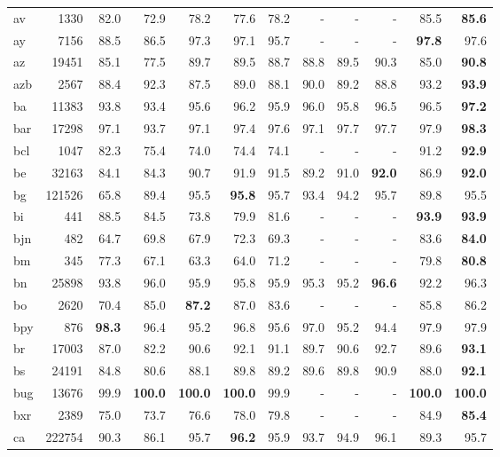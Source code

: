 \documentclass[11pt,a4paper]{article}
\begin{document}
\begin{supertabular}{lrrr|rrr|rrr|rr}
av & 1330 & 82.0 & 72.9 & 78.2 & 77.6 & 78.2 & - & - & - & 85.5 & \textbf{85.6}\\
ay & 7156 & 88.5 & 86.5 & 97.3 & 97.1 & 95.7 & - & - & - & \textbf{97.8} & 97.6\\
az & 19451 & 85.1 & 77.5 & 89.7 & 89.5 & 88.7 & 88.8 & 89.5 & 90.3 & 85.0 & \textbf{90.8}\\
azb & 2567 & 88.4 & 92.3 & 87.5 & 89.0 & 88.1 & 90.0 & 89.2 & 88.8 & 93.2 & \textbf{93.9}\\
ba & 11383 & 93.8 & 93.4 & 95.6 & 96.2 & 95.9 & 96.0 & 95.8 & 96.5 & 96.5 & \textbf{97.2}\\
bar & 17298 & 97.1 & 93.7 & 97.1 & 97.4 & 97.6 & 97.1 & 97.7 & 97.7 & 97.9 & \textbf{98.3}\\
bcl & 1047 & 82.3 & 75.4 & 74.0 & 74.4 & 74.1 & - & - & - & 91.2 & \textbf{92.9}\\
be & 32163 & 84.1 & 84.3 & 90.7 & 91.9 & 91.5 & 89.2 & 91.0 & \textbf{92.0} & 86.9 & \textbf{92.0}\\
bg & 121526 & 65.8 & 89.4 & 95.5 & \textbf{95.8} & 95.7 & 93.4 & 94.2 & 95.7 & 89.8 & 95.5\\
bi & 441 & 88.5 & 84.5 & 73.8 & 79.9 & 81.6 & - & - & - & \textbf{93.9} & \textbf{93.9}\\
bjn & 482 & 64.7 & 69.8 & 67.9 & 72.3 & 69.3 & - & - & - & 83.6 & \textbf{84.0}\\
bm & 345 & 77.3 & 67.1 & 63.3 & 64.0 & 71.2 & - & - & - & 79.8 & \textbf{80.8}\\
bn & 25898 & 93.8 & 96.0 & 95.9 & 95.8 & 95.9 & 95.3 & 95.2 & \textbf{96.6} & 92.2 & 96.3\\
bo & 2620 & 70.4 & 85.0 & \textbf{87.2} & 87.0 & 83.6 & - & - & - & 85.8 & 86.2\\
bpy & 876 & \textbf{98.3} & 96.4 & 95.2 & 96.8 & 95.6 & 97.0 & 95.2 & 94.4 & 97.9 & 97.9\\
br & 17003 & 87.0 & 82.2 & 90.6 & 92.1 & 91.1 & 89.7 & 90.6 & 92.7 & 89.6 & \textbf{93.1}\\
bs & 24191 & 84.8 & 80.6 & 88.1 & 89.8 & 89.2 & 89.6 & 89.8 & 90.9 & 88.0 & \textbf{92.1}\\
bug & 13676 & 99.9 & \textbf{100.0} & \textbf{100.0} & \textbf{100.0} & 99.9 & - & - & - & \textbf{100.0} & \textbf{100.0}\\
bxr & 2389 & 75.0 & 73.7 & 76.6 & 78.0 & 79.8 & - & - & - & 84.9 & \textbf{85.4}\\
ca & 222754 & 90.3 & 86.1 & 95.7 & \textbf{96.2} & 95.9 & 93.7 & 94.9 & 96.1 & 89.3 & 95.7\\

\end{supertabular}
\end{document}
